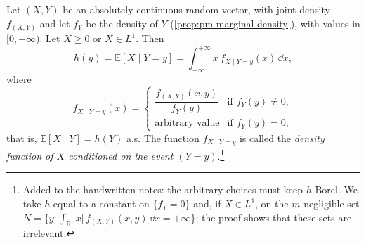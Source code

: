\begin{theorem}\label{thm:ce-density}
Let $(X,Y)$ be an absolutely continuous random vector, with joint density $f_{(X,Y)}$ and let
$f_Y$ be the density of $Y$ (\cref{prop:pm-marginal-density}), with values in $[0,+\infty)$.
Let $X\ge0$ or $X\in L^1$. Then
\[
  h(y)=\mathbb E[X\mid Y=y]=\int_{-\infty}^{+\infty}x\,f_{X\mid Y=y}(x)\,\dd x,
\]
where
\[
  f_{X\mid Y=y}(x)=
  \begin{cases}
    \dfrac{f_{(X,Y)}(x,y)}{f_Y(y)}&\text{if }f_Y(y)\ne0,\\[1.2ex]
    \text{arbitrary value}&\text{if }f_Y(y)=0;
  \end{cases}
\]
that is, $\mathbb E[X\mid Y]=h(Y)$ a.s. The function $f_{X\mid Y=y}$ is called the
\emph{density function of $X$ conditioned on the event $(Y=y)$}.\footnote{Added to the
handwritten notes: the arbitrary choices must keep $h$ Borel. We take $h$ equal to a constant
on $\{f_Y=0\}$ and, if $X\in L^1$, on the $m$-negligible set
$N=\{y:\int_{\mathbb R}|x|\,f_{(X,Y)}(x,y)\,\dd x=+\infty\}$; the proof shows that these sets are
irrelevant.}
\end{theorem}

